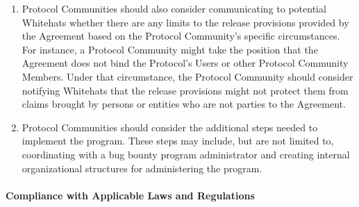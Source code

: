 \begin{enumerate}
\begin{enumerate}[label=\alph*.]
              \item Protocol Communities should also consider communicating to potential Whitehats whether there are any limits to the release provisions provided by the Agreement based on the Protocol Community's specific circumstances. For instance, a Protocol Community might take the position that the Agreement does not bind the Protocol's Users or other Protocol Community Members. Under that circumstance, the Protocol Community should consider notifying Whitehats that the release provisions might not protect them from claims brought by persons or entities who are not parties to the Agreement.

              \item Protocol Communities should consider the additional steps needed to implement the program. These steps may include, but are not limited to, coordinating with a bug bounty program administrator and creating internal organizational structures for administering the program.
          \end{enumerate}
\end{enumerate}

\paragraph{Compliance with Applicable Laws and Regulations}\label{exhibit:f:compliance}

